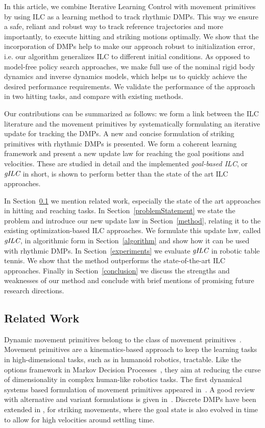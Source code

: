 In this article, we combine Iterative Learning Control with movement primitives by using ILC as a learning method to track rhythmic DMPs. This way we ensure a safe, reliant and robust way to track reference trajectories and more importantly, to execute hitting and striking motions optimally. We show that the incorporation of DMPs help to make our approach robust to initialization error, i.e. our algorithm generalizes ILC to different initial conditions. As opposed to model-free policy search approaches, we make full use of the nominal rigid body dynamics and inverse dynamics models, which helps us to quickly achieve the desired performance requirements. We validate the performance of the approach in two hitting tasks, and compare with existing methods.

Our contributions can be summarized as follows: we form a link between the ILC literature and the movement primitives by systematically formulating an iterative update for tracking the DMPs. A new and concise formulation of striking primitives with rhythmic DMPs is presented. We form a coherent learning framework and present a new update law for reaching the goal positions and velocities. These are studied in detail and the implemented \emph{goal-based ILC}, or $\emph{gILC}$ in short, is shown to perform better than the state of the art ILC approaches.

In Section~\ref{relatedWork} we mention related work, especially the state of the art approaches in hitting and reaching tasks. In Section~\ref{problemStatement} we state the problem and introduce our new update law in Section~\ref{method}, relating it to the existing optimization-based ILC approaches. We formulate this update law, called $\emph{gILC}$, in algorithmic form in Section~\ref{algorithm} and show how it can be used with rhythmic DMPs. In Section~\ref{experiments} we evaluate $\emph{gILC}$ in robotic table tennis. We show that the method outperforms the state-of-the-art ILC approaches. Finally in Section~\ref{conclusion} we discuss the strengths and weaknesses of our method and conclude with brief mentions of promising future research directions.

\subsection{Related Work}\label{relatedWork}

Dynamic movement primitives belong to the class of movement primitives~\cite{Flash85}. Movement primitives are a kinematics-based approach to keep the learning tasks in high-dimensional tasks, such as in humanoid robotics, tractable. Like the options framework in Markov Decision Processes~\cite{Sutton99}, they aim at reducing the curse of dimensionality in complex human-like robotics tasks. The first dynamical systems based formulation of movement primitives appeared in~\cite{Ijspeert02}. A good review with alternative and variant formulations is given in~\cite{Ijspeert13}. Discrete DMPs have been extended in \cite{Kober10}, \cite{Muelling13} for striking movements, where the goal state is also evolved in time to allow for high velocities around settling time.

